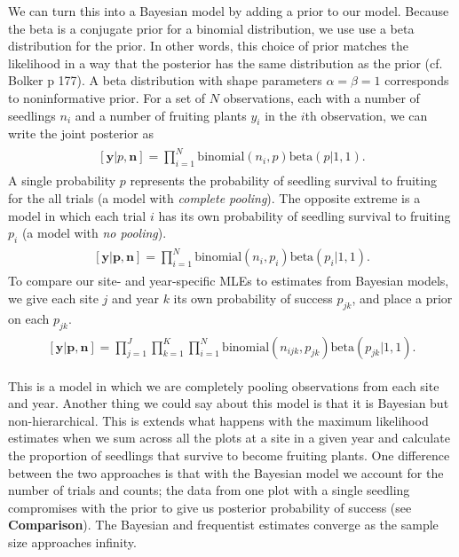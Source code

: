 \documentclass[12pt, oneside, titlepage]{article}   	%
\begin{document}
We can turn this into a Bayesian model by adding a prior to our model. Because the beta is a conjugate prior for a binomial distribution, we use use a beta distribution for the prior. In other words, this choice of prior matches the likelihood in a way that the posterior has the same distribution as the prior (cf. Bolker p 177). A beta distribution with shape parameters $\alpha=\beta=1$ corresponds to noninformative prior. For a set of $N$ observations, each with a number of seedlings $n_i$ and a number of fruiting plants $y_i$ in the $i$th observation, we can write the joint posterior as
%
\begin{align}
  \begin{split}
[\bm{y}|p,\bm{n}]  = \prod_{i=1}^N \mathrm{binomial}(n_i,p) \mathrm{beta} (  p | 1 , 1 ).
  \end{split}
\end{align}
%
A single probability $p$ represents the probability of seedling survival to fruiting for the all trials (a model with \textit{complete pooling}). The opposite extreme is a model in which each trial $i$ has its own probability of seedling survival to fruiting $p_i$ (a model with \textit{no pooling}). 
%
\begin{align}
  \begin{split}
[\bm{y}|\bm{p},\bm{n}]  = \prod_{i=1}^N \mathrm{binomial}(n_i,p_i) \mathrm{beta} (  p_i | 1 , 1 ).
  \end{split}
\end{align}
%
To compare our site- and year-specific MLEs to estimates from Bayesian models, we give each site $j$ and year $k$ its own probability of success $p_{jk}$, and place a prior on each $p_{jk}$.
%
\begin{align}
  \begin{split}
[\bm{y}|\bm{p},\bm{n}]  = \prod_{j=1}^J\prod_{k=1}^K\prod_{i=1}^N \mathrm{binomial}(n_{ijk},p_{jk}) \mathrm{beta} (  p_{jk} | 1 , 1 ). \label{eq:bayesianNH}
  \end{split}
\end{align}
%

This is a model in which we are completely pooling observations from each site and year.  Another thing we could say about this model is that it is Bayesian but non-hierarchical. This is extends what happens with the maximum likelihood estimates when we sum across all the plots at a site in a given year and calculate the proportion of seedlings that survive to become fruiting plants. One difference between the two approaches is that with the Bayesian model we account for the number of trials and counts; the data from one plot with a single seedling compromises with the prior to give us posterior probability of success (see \textbf{Comparison}). The Bayesian and frequentist estimates converge as the sample size approaches infinity. 
\end{document}
